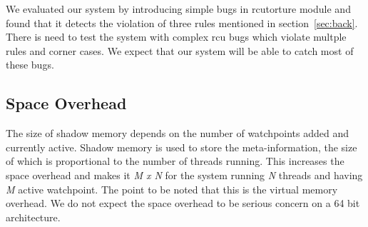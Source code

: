 
We evaluated our system by introducing simple bugs in rcutorture module and
found that it detects the violation of three rules mentioned in
section~\ref{sec:back}. There is need to test the system with complex rcu bugs
which violate multple rules and corner cases. We expect
that our system will be able to catch most of these bugs.


\subsection{Space Overhead}
The size of shadow memory depends on the number of watchpoints added and currently active. Shadow memory is used to store the meta-information, the size of which is proportional to the number of threads running. This increases the space overhead and makes it \emph{M x N} for the system running \emph{N} threads and having \emph{M} active watchpoint. The point to be noted that this is the virtual memory overhead. We do not expect the space overhead to be serious concern on a 64 bit architecture.    


